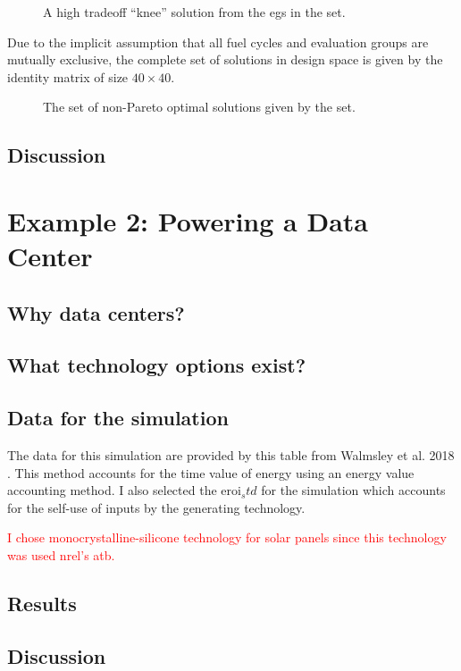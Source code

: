 \begin{figure}[ht!]
  \centering
  \resizebox{\columnwidth}{!}{}
  \caption{A high tradeoff ``knee'' solution from the \acp{eg} in the \ac{set}.}
  \label{fig:single-eg-set-space}
\end{figure}

Due to the implicit assumption that all fuel cycles and evaluation groups are mutually exclusive,
the complete set of solutions in design space is given by the identity matrix of size $40 \times 40$.

\begin{figure}[ht!]
  \centering
  \resizebox{\columnwidth}{!}{}
  \caption{The set of non-Pareto optimal solutions given by the \ac{set}.}
  \label{fig:single-eg-set-space}
\end{figure}


\subsection{Discussion}

\section{Example 2: Powering a Data Center}

\subsection{Why data centers?}

\subsection{What technology options exist?}

\subsection{Data for the simulation}

The data for this simulation are provided by this table from Walmsley et al. 2018 \cite{walmsley_energy_2018}. This method
accounts for the time value of energy using an energy value accounting method. I also selected the \acs{eroi}$_std$ for the simulation
which accounts for the self-use of inputs by the generating technology.

\textcolor{red}{I chose monocrystalline-silicone technology for solar panels since this technology was used \ac{nrel}'s \ac{atb}.}

\subsection{Results}

\subsection{Discussion}
